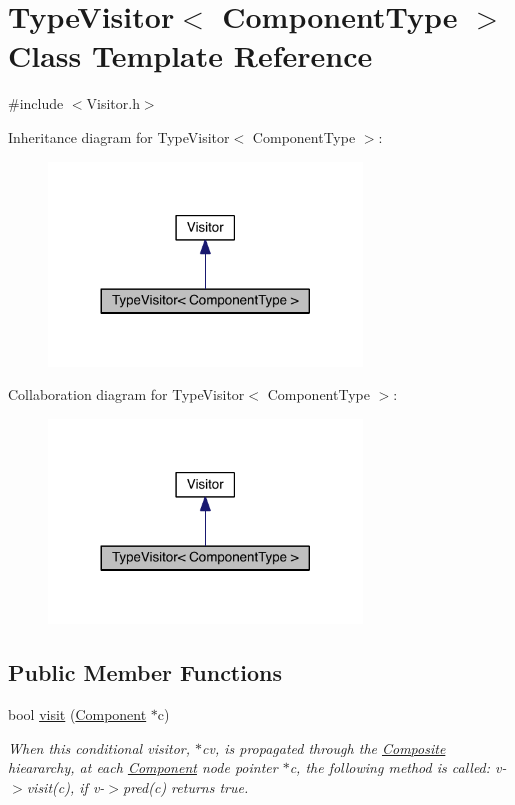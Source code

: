 \hypertarget{classTypeVisitor}{\section{Type\+Visitor$<$ Component\+Type $>$ Class Template Reference}
\label{classTypeVisitor}
}


{\ttfamily \#include $<$Visitor.\+h$>$}



Inheritance diagram for Type\+Visitor$<$ Component\+Type $>$\+:\nopagebreak
\begin{figure}[H]
\begin{center}
\leavevmode
\includegraphics[width=236pt]{classTypeVisitor__inherit__graph}
\end{center}
\end{figure}


Collaboration diagram for Type\+Visitor$<$ Component\+Type $>$\+:\nopagebreak
\begin{figure}[H]
\begin{center}
\leavevmode
\includegraphics[width=236pt]{classTypeVisitor__coll__graph}
\end{center}
\end{figure}
\subsection*{Public Member Functions}
\begin{DoxyCompactItemize}
\item 
bool \hyperlink{classVisitor_a3f8ea7ad6aa61e99d8d1bc0576bdf23c}{visit} (\hyperlink{classComponent}{Component} $\ast$c)
\begin{DoxyCompactList}\small\item\em When this conditional visitor, $\ast$cv, is propagated through the \hyperlink{classComposite}{Composite} hieararchy, at each \hyperlink{classComponent}{Component} node pointer $\ast$c, the following method is called\+: v-\/$>$visit(c), if v-\/$>$pred(c) returns true. \end{DoxyCompactList}\end{DoxyCompactItemize}
